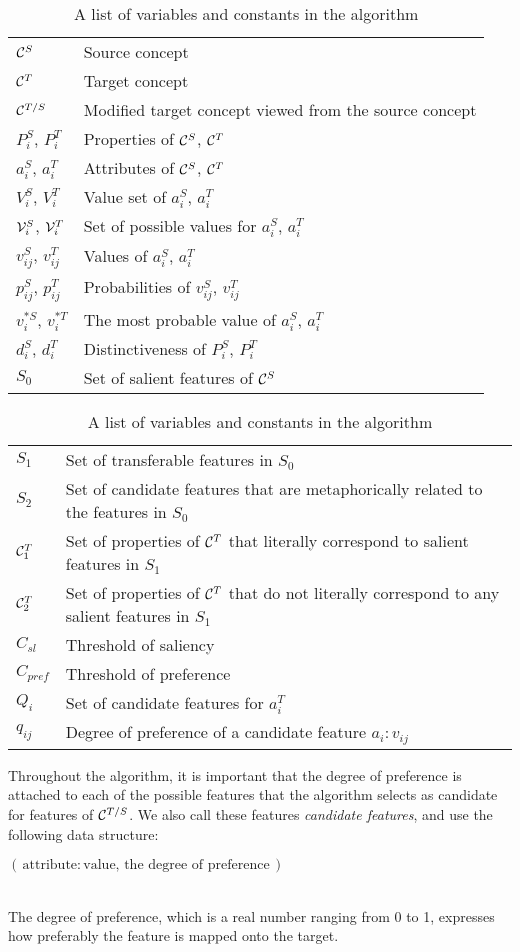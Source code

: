 \begin{table}[t]
  \caption{A list of variables and constants in the algorithm} \label{tbl:notation}
  \begin{tabular}[t]{lp{48mm}}
   ${\cal C}^S$ & Source concept \\ ${\cal C}^T$ & Target concept \\
   ${\cal C}^{T/S}$ & Modified target concept viewed \newline from the source concept\\
   $P^S_i$, $P^T_i$ & Properties of ${\cal C}^S$, ${\cal C}^T$ \\
   $a^S_i$, $a^T_i$ & Attributes of ${\cal C}^S$, ${\cal C}^T$ \\
   $V^S_i$, $V^T_i$ & Value set of $a^S_i$, $a^T_i$ \\
   ${\cal V}^S_i$, ${\cal V}^T_i$ & Set of possible values for $a^S_i$, $a^T_i$\\
   $v^S_{ij}$, $v^T_{ij}$ & Values of $a^S_i$, $a^T_i$ \\
   $p^S_{ij}$, $p^T_{ij}$ & Probabilities of $v^S_{ij}$, $v^T_{ij}$ \\
   $v^{*S}_i$, $v^{*T}_i$ & The most probable value of $a^S_i$, $a^T_i$ \\
   $d^S_i$, $d^T_i$ & Distinctiveness of $P^S_i$, $P^T_i$ \\
   $S_0$ & Set of salient features of ${\cal C}^S$ 
  \end{tabular}
  \begin{tabular}[t]{lp{58mm}}
   $S_1$ & Set of transferable features in $S_0$ \\
   $S_2$ & 
   Set of candidate features that are meta\-phorically related to the features in $S_0$ \\
   ${\cal C}^T_1$ &
   Set of properties of ${\cal C}^T$ that literally correspond to salient features in $S_1$ \\
   ${\cal C}^T_2$ & Set of properties of ${\cal C}^T$ that do not literally
   correspond to any salient features in $S_1$ \\
   $C_{sl}$ & Threshold of saliency \\ $C_{pref}$ & Threshold of preference \\
   $Q_i$ & Set of candidate features for $a^T_i$ \\
   $q_{ij}$ & Degree of preference of a candi\-date feature $a_i\!:\!v_{ij}$
  \end{tabular}
\end{table}

Throughout the algorithm, it is important that
the degree of preference is attached to each of the possible features that
the algorithm selects as candidate for features of ${\cal C}^{T/S}$. 
We also call these features {\it candidate features}, and
use the following data structure:\\
\centerline{$(\, \mbox{attribute}\!:\!\mbox{value},\, \mbox{the degree of preference}\,)$}\\
The degree of preference, which is a real number ranging from 0 to 1, expresses
how preferably the feature is mapped onto the target.

